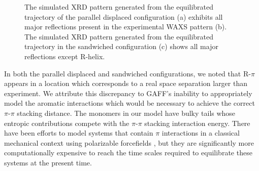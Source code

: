\documentclass[journal=jpcbfk,manusciprt=article]{achemso}
\begin{document}
\begin{figure}
\begin{subfigure}{0.0544\linewidth}
  \end{subfigure}
  \caption{The simulated XRD pattern generated from the equilibrated trajectory
	  of the parallel displaced configuration (a) exhibits all major reflections
	  present in the experimental WAXS pattern (b). The simulated XRD pattern
	  generated from the equilibrated trajectory in the sandwiched configuration (c) shows
	  all major reflections except R-helix.}
  \label{fig:XRDsim}
  \end{figure}


  In both the parallel displaced and sandwiched configurations, we noted that
  R-$\pi$ appears in a location which corresponds to a real space separation
  larger than experiment. We attribute this discrepancy to GAFF's inability to
  appropriately model the aromatic interactions which would be necessary to
  achieve the correct $\pi$-$\pi$ stacking distance. 
  The monomers in our model have bulky tails whose entropic contributions compete
  with the $\pi$-$\pi$ stacking interaction energy. There have been efforts to
  model systems that contain $\pi$ interactions in a classical mechanical context
  using polarizable forcefields \cite{baker_polarizable_2015},
  but they are significantly more computationally expensive to
  reach the time scales required to equilibrate these systems at the present time.
\end{document}
